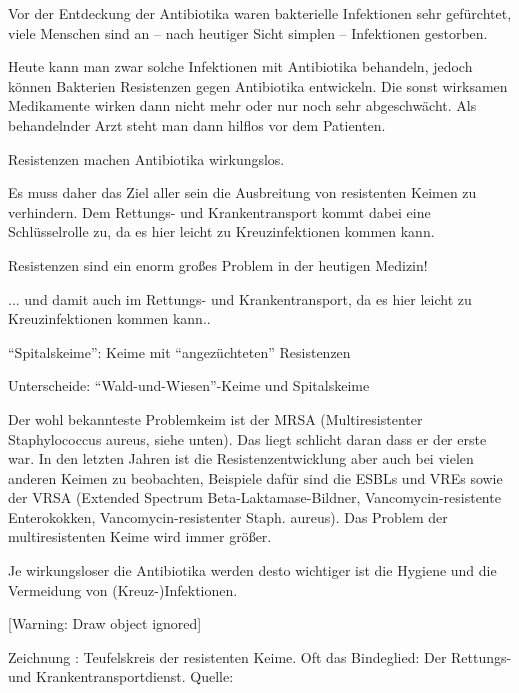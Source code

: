 \documentclass{article}
\newcounter{Drawing}
\renewcommand\theDrawing{\arabic{Drawing}}
\begin{document}
Vor der Entdeckung der Antibiotika waren bakterielle Infektionen sehr
gef\"urchtet, viele Menschen sind an -- nach heutiger Sicht simplen --
Infektionen gestorben. 

Heute kann man zwar solche Infektionen mit Antibiotika behandeln, jedoch
k\"onnen Bakterien Resistenzen gegen Antibiotika entwickeln. Die sonst
wirksamen Medikamente wirken dann nicht mehr oder nur noch sehr
abgeschw\"acht. Als behandelnder Arzt steht man dann hilflos vor dem
Patienten. 

Resistenzen machen Antibiotika wirkungslos. 

Es muss daher das Ziel aller sein die Ausbreitung von resistenten Keimen
zu verhindern. Dem Rettungs- und Krankentransport kommt dabei eine
Schl\"usselrolle zu, da es hier leicht zu Kreuzinfektionen kommen kann.


Resistenzen sind ein enorm gro{\ss}es Problem in der heutigen Medizin!

... und damit auch im Rettungs- und Krankentransport, da es hier leicht
zu Kreuzinfektionen kommen kann..

{\textquotedblleft}Spitalskeime{\textquotedblright}:
Keime mit {\textquotedblleft}angez\"uchteten{\textquotedblright}
Resistenzen

Unterscheide:
{\textquotedblleft}Wald-und-Wiesen{\textquotedblright}-Keime und
Spitalskeime 

Der wohl bekannteste Problemkeim ist der MRSA (Multiresistenter
Staphylococcus aureus, siehe unten). Das liegt schlicht daran dass er
der erste war. In den letzten Jahren ist die Resistenzentwicklung aber
auch bei vielen anderen Keimen zu beobachten, Beispiele daf\"ur sind
die ESBL{\textquotesingle}s und VRE{\textquotesingle}s sowie der VRSA
(Extended Spectrum Beta-Laktamase-Bildner, Vancomycin-resistente
Enterokokken, Vancomycin-resistenter Staph. aureus). Das Problem der
multiresistenten Keime wird immer gr\"o{\ss}er.

Je wirkungsloser die Antibiotika werden desto wichtiger ist die Hygiene
und die Vermeidung von (Kreuz-)Infektionen. 

\begin{minipage}{13.67cm}
[Warning: Draw object ignored]

Zeichnung \stepcounter{Drawing}{\theDrawing}: Teufelskreis der
resistenten Keime. Oft das Bindeglied: Der Rettungs- und
Krankentransportdienst. Quelle: 

\end{minipage}
\end{document}
